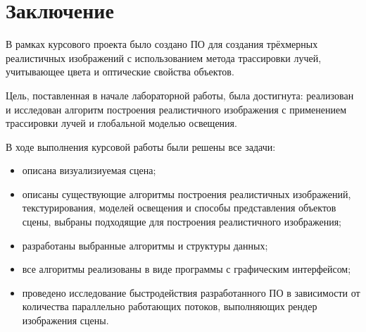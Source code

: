 \chapter*{Заключение}

В рамках курсового проекта было создано ПО для создания трёхмерных реалистичных изображений с использованием метода трассировки лучей, учитывающее цвета и оптические свойства объектов.

Цель, поставленная в начале лабораторной работы, была достигнута: реализован и исследован алгоритм построения реалистичного изображения с применением трассировки лучей и глобальной моделью освещения.

В ходе выполнения курсовой работы были решены все задачи:
\begin{itemize}[label=---]
	\item описана визуализиуемая сцена;
	\item описаны существующие алгоритмы построения реалистичных изображений, текстурирования, моделей освещения и способы представления объектов сцены, выбраны подходящие для построения реалистичного изображения;
	\item разработаны выбранные алгоритмы и структуры данных;
	\item все алгоритмы реализованы в виде программы с графическим интерфейсом;
	\item проведено исследование быстродействия разработанного ПО в зависимости от количества параллельно работающих потоков, выполняющих рендер изображения сцены.
\end{itemize}